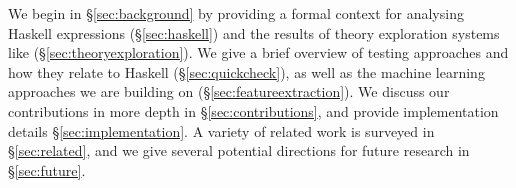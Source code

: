 We begin in \S \ref{sec:background} by providing a formal context for analysing Haskell expressions (\S \ref{sec:haskell}) and the results of theory exploration systems like \qspec{} (\S \ref{sec:theoryexploration}). We give a brief overview of testing approaches and how they relate to Haskell (\S \ref{sec:quickcheck}), as well as the machine learning approaches we are building on (\S \ref{sec:featureextraction}). We discuss our contributions in more depth in \S \ref{sec:contributions}, and provide implementation details \S \ref{sec:implementation}. A variety of related work is surveyed in \S \ref{sec:related}, and we give several potential directions for future research in \S \ref{sec:future}.
